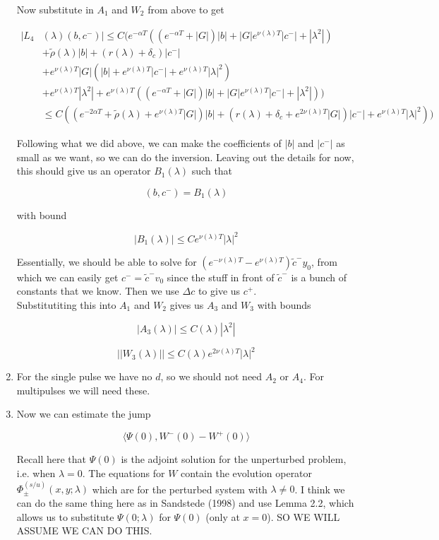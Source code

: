 \documentclass[12pt]{article}
\begin{document}
\begin{enumerate}
Now substitute in $A_1$ and $W_2$ from above to get

\begin{align*}
|L_4&(\lambda)(b, c^-)| \leq C( e^{-\alpha T}( (e^{-\alpha T} + |G|)|b| + |G|e^{\nu(\lambda)T}|c^-| + |\lambda^2|) \\ 
&+ \tilde{\rho}(\lambda)|b| + 
(r(\lambda) + \delta_c )|c^-| \\
&+ e^{\nu(\lambda)T} |G|(|b| + e^{\nu(\lambda)T}|c^-| + e^{\nu(\lambda)T}|\lambda|^2)\\
&+ e^{\nu(\lambda)T}|\lambda^2| + e^{\nu(\lambda)T}( (e^{-\alpha T} + |G|)|b| + |G|e^{\nu(\lambda)T}|c^-| + |\lambda^2|)) \\
&\leq C( ( e^{-2\alpha T} + \tilde{\rho}(\lambda) + e^{\nu(\lambda)T} |G|)|b| +
(r(\lambda) + \delta_c + e^{2\nu(\lambda)T} |G| )|c^-| +  e^{\nu(\lambda)T}|\lambda|^2) )
\end{align*}

Following what we did above, we can make the coefficients of $|b|$ and $|c^-|$ as small as we want, so we can do the inversion. Leaving out the details for now, this should give us an operator $B_1(\lambda)$ such that

\[
(b, c^-) = B_1(\lambda)
\]

with bound

\[
|B_1(\lambda)| \leq C e^{\nu(\lambda)T}|\lambda|^2
\]

Essentially, we should be able to solve for $(e^{-\nu(\lambda)T} - e^{\nu(\lambda)T}) \tilde{c}^- y_0$, from which we can easily get $c^- = \tilde{c}^- v_0$ since the stuff in front of $\tilde{c}^-$ is a bunch of constants that we know. Then we use $\Delta c$ to give us $c^+$.\\

Substitutiting this into $A_1$ and $W_2$ gives us $A_3$ and $W_3$ with bounds

\[
|A_3(\lambda)| \leq C(\lambda)|\lambda^2|
\]

\[
||W_3(\lambda)|| \leq C(\lambda) e^{2 \nu(\lambda)T}|\lambda|^2
\]

\item For the single pulse we have no $d$, so we should not need $A_2$ or $A_4$. For multipulses we will need these.

\item Now we can estimate the jump

\[
\langle \Psi(0), W^-(0) - W^+(0) \rangle 
\]

Recall here that $\Psi(0)$ is the adjoint solution for the unperturbed problem, i.e. when $\lambda = 0$. The equations for $W$ contain the evolution operator $\Phi^(s/u)_\pm(x, y; \lambda)$ which are for the perturbed system with $\lambda \neq 0$. I think we can do the same thing here as in Sandstede (1998) and use Lemma 2.2, which allows us to substitute $\Psi(0; \lambda)$ for $\Psi(0)$ (only at $x = 0$). SO WE WILL ASSUME WE CAN DO THIS.\\  


\end{enumerate}
\end{document}
